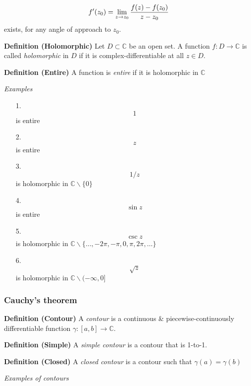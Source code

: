 \documentclass[12pt,a4paper]{article}
\begin{document}
\[
   f'(z_0) =  \lim_{z \rightarrow z_0} {f(z) - f(z_0) \over z - z_0}
\]
exists, for any angle of approach to $z_0$.

\textbf{Definition (Holomorphic)} Let $D \subset {\mathbb C}$ be an open set.  A function $f : D \rightarrow {\mathbb C}$ is called \emph{holomorphic} in $D$ if it is complex-differentiable at all $z \in D$.

\textbf{Definition (Entire)} A function is \emph{entire} if it is holomorphic in ${\mathbb C}$

\emph{Examples}

\begin{itemize}
\item[1. ] \[
1
\]
is entire


\item[2. ] \[
z
\]
is entire


\item[3. ] \[
1/z
\]
is holomorphic in ${\mathbb C} \backslash \{0\}$


\item[4. ] \[
\sin z
\]
is entire


\item[5. ] \[
\csc z
\]
is holomorphic in ${\mathbb C} \backslash \{\ldots,-2\pi,-\pi,0,\pi,2\pi,\ldots\}$


\item[6. ] \[
\sqrt z
\]
is holomorphic in ${\mathbb C} \backslash (-\infty,0]$

\end{itemize}
\subsubsection{Cauchy's theorem}
\textbf{Definition (Contour)} A \emph{contour}  is a continuous \& piecewise-continuously differentiable function $\gamma : [a,b] \rightarrow {\mathbb C}$.

\textbf{Definition (Simple)} A \emph{simple contour} is a contour that is 1-to-1.

\textbf{Definition (Closed)} A \emph{closed contour} is a contour such that $\gamma(a) = \gamma(b)$

\emph{Examples of contours}
\end{document}
